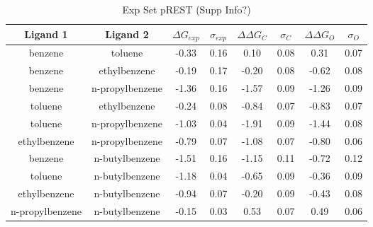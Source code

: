 \documentclass[T4paper.tex]{subfiles}
\begin{document}
\begin{table}[]
\centering
\caption{Exp Set pREST (Supp Info?)}
\label{tbl:exp_pREST_set}
\begin{tabular}{|c|c|c|c|c|c|c|c|}
\hline
\textbf{Ligand 1}                                & \textbf{Ligand 2}                                & \boldmath$\Delta G_{exp}$  & \boldmath$\sigma_{exp}$ & {\color[HTML]{800080} \boldmath$\Delta\Delta G_{C}$} & {\color[HTML]{800080} \boldmath$\sigma_{C}$} & {\color[HTML]{008000} \boldmath$\Delta\Delta G_{O}$} & {\color[HTML]{008000} \boldmath$\sigma_{O}$} \\ \hline
\cellcolor[HTML]{800080}benzene         & \cellcolor[HTML]{800080}toluene         & -0.33        & 0.16            & 0.10       & 0.08          & 0.31       & 0.07          \\ \hline
\cellcolor[HTML]{800080}benzene         & \cellcolor[HTML]{800080}ethylbenzene    &-0.19 & 0.17  & -0.20 & 0.08  & -0.62 & 0.08          \\ \hline
\cellcolor[HTML]{800080}benzene         & \cellcolor[HTML]{800080}n-propylbenzene & -1.36 & 0.16 & -1.57 & 0.09  & -1.26 & 0.09         \\ \hline
\cellcolor[HTML]{800080}toluene         & \cellcolor[HTML]{800080}ethylbenzene    & -0.24 & 0.08  & -0.84 & 0.07  & -0.83 & 0.07          \\ \hline
\cellcolor[HTML]{800080}toluene         & \cellcolor[HTML]{800080}n-propylbenzene & -1.03 & 0.04  & -1.91 & 0.09  & -1.44 & 0.08          \\ \hline
\cellcolor[HTML]{800080}ethylbenzene    & \cellcolor[HTML]{800080}n-propylbenzene & -0.79 & 0.07  & -1.08 & 0.07  & -0.80 & 0.06         \\ \hline
\cellcolor[HTML]{800080}benzene         & \cellcolor[HTML]{00FFFF}n-butylbenzene  & -1.51 & 0.16 & -1.15 & 0.11  & -0.72 & 0.12         \\ \hline
\cellcolor[HTML]{800080}toluene         & \cellcolor[HTML]{00FFFF}n-butylbenzene  & -1.18 & 0.04  & -0.65 & 0.09  & -0.36 & 0.09         \\ \hline
\cellcolor[HTML]{800080}ethylbenzene    & \cellcolor[HTML]{00FFFF}n-butylbenzene  & -0.94 & 0.07  & -0.20 & 0.09  & -0.43 & 0.08         \\ \hline
\cellcolor[HTML]{800080}n-propylbenzene & \cellcolor[HTML]{00FFFF}n-butylbenzene  & -0.15 & 0.03  & 0.53  & 0.07  & 0.49  & 0.06       \\ \hline
\end{tabular}
\end{table}
\end{document}
